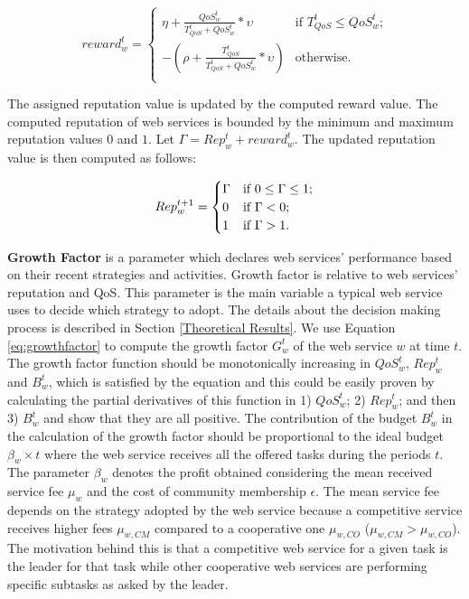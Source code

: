 \documentclass[fleqn]{singlecol-new}
\begin{document}
\begin{equation} \label{repr}
reward_w^t= \begin{cases}
\eta + \frac{QoS_w^t}{T_{QoS}^t+QoS_w^t} * \upsilon  & \text{if $T_{QoS}^t\leq QoS_w^t$;}\\
-(\rho + \frac{T_{QoS}^t}{T_{QoS}^t+QoS_w^t} * \upsilon) & \text{otherwise.}\\
\end{cases}
\end{equation}

The assigned reputation value is updated by the computed reward
value. The computed reputation of web services is bounded by the
minimum and maximum reputation values $0$ and $1$. %
Let $\Gamma = Rep_{w}^{t} + reward_w^t$. The updated reputation
value is then computed as follows:

\begin{equation}\label{repz}
Rep_{w}^{t+1} = \begin{cases}

\Gamma & \text{if $ 0 \leq \Gamma \leq 1$;}\\
0  & \text{if $\Gamma < 0$;}\\
1 & \text{if $\Gamma > 1$.}\\
\end{cases}
\end{equation}

\textbf{Growth Factor} is a parameter which declares web services'
performance based on their recent strategies and activities.
Growth factor is relative to web services' reputation and QoS.
This parameter is the main variable a typical web service uses to
decide which strategy to adopt. The details about the decision
making process is described in Section \ref{Theoretical Results}.
We use Equation \ref{eq:growthfactor} to compute the growth factor
$G^t_w$ of the web service $w$ at time $t$. The growth factor
function should be monotonically increasing in $QoS_w^t$,
$Rep^t_w$ and $B_w^t$, which is satisfied by the equation and this
could be easily proven by calculating the partial derivatives of
this function in 1) $QoS_w^t$; 2) $Rep^t_w$; and then 3) $B_w^t$
and show that they are all positive. The contribution of the
budget $B_w^t$ in the calculation of the growth factor should be
proportional to the ideal budget $\beta_w \times t$ where the web
service receives all the offered tasks during the periods $t$. The
parameter $\beta_w$ denotes the profit obtained considering the
mean received service fee $\mu_w$ and the cost of community
membership $\epsilon$. The mean service fee depends on the
strategy adopted by the web service because a competitive service
receives higher fees $\mu_{w, CM}$ compared to a cooperative one
$\mu_{w, CO}$ ($\mu_{w, CM} > \mu_{w, CO}$). The motivation behind
this is that a competitive web service for a given task is the
leader for that task while other cooperative web services are
performing specific subtasks as asked by the leader.
\end{document}
